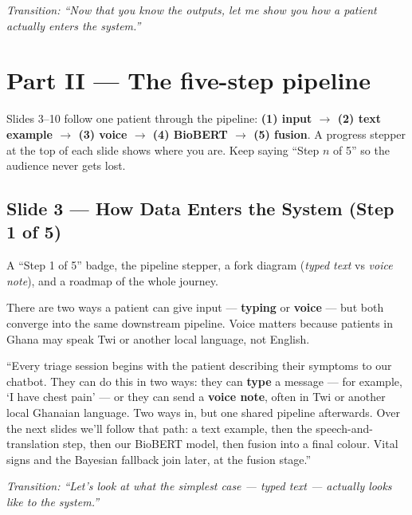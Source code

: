 \documentclass[11pt]{article}
\newcommand{\transition}[1]{\medskip\noindent\textit{\textcolor{mutel}{Transition: #1}}\medskip}
\newcommand{\route}[1]{{\small\texttt{\textcolor{mutel}{#1}}}}
\newcommand{\slide}[3]{%
  \subsection{Slide #1 --- #2}%
  \noindent\route{Route: #3}\par\smallskip}
\begin{document}
\transition{``Now that you know the outputs, let me show you how a patient actually enters the system.''}

\section{Part II --- The five-step pipeline}

\begin{idea}
Slides 3--10 follow one patient through the pipeline: \textbf{(1) input $\rightarrow$ (2) text example
$\rightarrow$ (3) voice $\rightarrow$ (4) BioBERT $\rightarrow$ (5) fusion}. A progress stepper at the top
of each slide shows where you are. Keep saying ``Step $n$ of 5'' so the audience never gets lost.
\end{idea}

\slide{3}{How Data Enters the System (Step 1 of 5)}{/dashboard/pipeline/input}

\begin{onscreen}
A ``Step 1 of 5'' badge, the pipeline stepper, a fork diagram (\emph{typed text} vs \emph{voice note}),
and a roadmap of the whole journey.
\end{onscreen}

\begin{idea}
There are two ways a patient can give input --- \textbf{typing} or \textbf{voice} --- but both converge
into the same downstream pipeline. Voice matters because patients in Ghana may speak Twi or another local
language, not English.
\end{idea}

\begin{saybox}
``Every triage session begins with the patient describing their symptoms to our chatbot. They can do this
in two ways: they can \textbf{type} a message --- for example, `I have chest pain' --- or they can send a
\textbf{voice note}, often in Twi or another local Ghanaian language. Two ways in, but one shared pipeline
afterwards. Over the next slides we'll follow that path: a text example, then the speech-and-translation
step, then our BioBERT model, then fusion into a final colour. Vital signs and the Bayesian fallback join
later, at the fusion stage.''
\end{saybox}

\transition{``Let's look at what the simplest case --- typed text --- actually looks like to the system.''}
\end{document}
